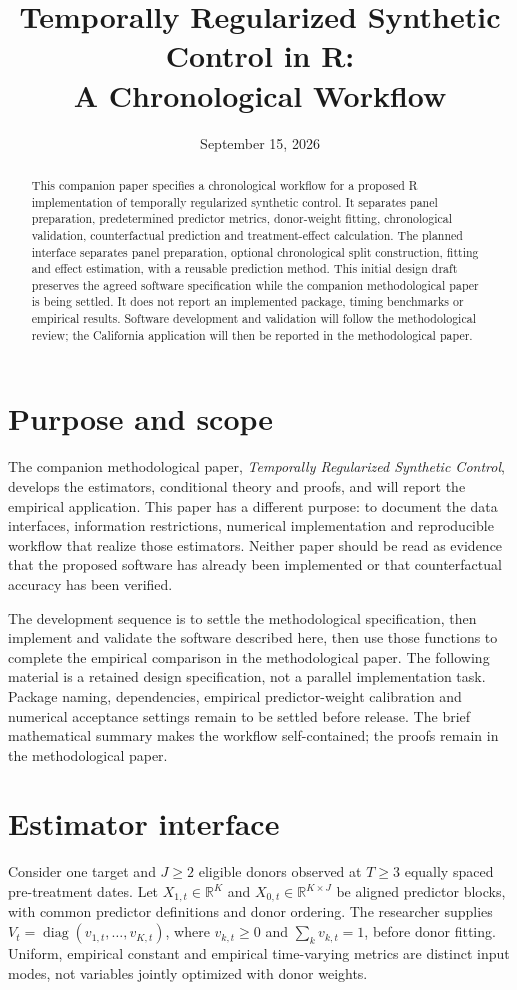 \documentclass[11pt]{article}
\title{Temporally Regularized Synthetic Control in R:\\
A Chronological Workflow}
\author{}
\date{September 15, 2026}
\begin{document}
\maketitle
\begin{abstract}
This companion paper specifies a chronological workflow for a proposed R
implementation of temporally regularized synthetic control. It separates
panel preparation, predetermined predictor metrics, donor-weight fitting,
chronological validation, counterfactual prediction and treatment-effect
calculation. The planned interface separates panel preparation, optional
chronological split construction, fitting and effect estimation, with a
reusable prediction method. This initial design draft preserves the agreed
software specification while the companion methodological paper is being
settled. It does not report an implemented package, timing benchmarks or
empirical results. Software development and validation will follow the
methodological review; the California application will then be reported
in the methodological paper.
\end{abstract}

\section{Purpose and scope}
The companion methodological paper, \emph{Temporally Regularized Synthetic
Control}, develops the estimators, conditional theory and proofs, and will
report the empirical application. This paper has a different purpose:
to document the data interfaces, information restrictions, numerical
implementation and reproducible workflow that realize those estimators.
Neither paper should be read as evidence that the proposed software has
already been implemented or that counterfactual accuracy has been verified.

The development sequence is to settle the methodological specification,
then implement and validate the software described here, then use those
functions to complete the empirical comparison in the methodological
paper. The following material is a retained design specification, not a
parallel implementation task. Package naming, dependencies, empirical
predictor-weight calibration and numerical acceptance settings remain to
be settled before release. The brief mathematical summary makes the
workflow self-contained; the proofs remain in the methodological paper.

\section{Estimator interface}\label{sec:framework}
Consider one target and $J\geq2$ eligible donors observed at $T\geq3$
equally spaced pre-treatment dates. Let $X_{1,t}\in\mathbb R^K$ and
$X_{0,t}\in\mathbb R^{K\times J}$ be aligned predictor blocks, with
common predictor definitions and donor ordering. The researcher supplies
$V_t=\operatorname{diag}(v_{1,t},\ldots,v_{K,t})$, where $v_{k,t}\geq0$
and $\sum_kv_{k,t}=1$, before donor fitting. Uniform, empirical constant
and empirical time-varying metrics are distinct input modes, not variables
jointly optimized with donor weights.
\end{document}
